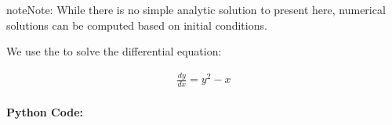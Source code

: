 \documentclass[letterpaper,10pt,english]{jupyterBook}
\begin{document}
\begin{sphinxadmonition}{note}{Note:}
\sphinxAtStartPar
While there is no simple analytic solution to present here, numerical solutions can be computed based on initial conditions.

\sphinxAtStartPar
We use the  to solve the differential equation:
\end{sphinxadmonition}
\begin{equation*}
\begin{split}
\frac{dy}{dx} = y^2 - x
\end{split}
\end{equation*}

\paragraph{Python Code:}
\label{\detokenize{prerequisites:python-code}}
\end{document}
